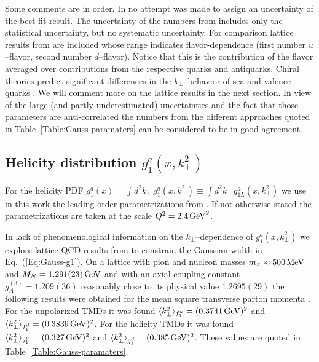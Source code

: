\documentclass[a4paper,11pt]{article}
\newcommand{\la}{\langle}
\newcommand{\ra}{\rangle}
\def\kperp{k_\perp}
\def\avkperp{\la \kperp^2 \ra}
\begin{document}
Some comments are in order.
In \cite{Anselmino:2005nn} no attempt was made to assign an uncertainty of the 
best fit result. The uncertainty of the numbers from \cite{Schweitzer:2010tt}
includes only the statistical uncertainty, but no systematic uncertainty.
For comparison lattice results from \cite{Hagler:2009mb} are included
whose range indicates flavor-dependence 
(first number $u$--flavor,
second number $d$--flavor). 
Notice that this is the contribution of the flavor averaged
over contributions from the respective quarks and antiquarks.
Chiral theories predict significant differences in the $\kperp$--behavior
of sea and valence quarks \cite{Schweitzer:2012hh}.
We will comment more on the lattice results in the next section.
In view of the large (and partly underestimated) uncertainties and the 
fact that those parameters are anti-correlated the numbers from the 
different approaches quoted in Table~\ref{Table:Gauss-paramaters} 
can be considered to be in good agreement. 

\subsection{\boldmath Helicity distribution $g_1^a(x,k_\perp^2)$}
\label{App:basis-g1}

For the helicity PDF $g_1^a(x)=\int d^2k_\perp\,g_1^a(x,k_\perp^2)\equiv 
\int d^2k_\perp\,g_{1L}^a(x,k_\perp^2)$ we use in this work the leading-order 
parametrizations from \cite{Gluck:1998xa}.
If not otherwise stated the parametrizations are taken at the scale 
$Q^2=2.4\,{\rm GeV}^2$.

In lack of phenomenological information on the $k_\perp$--dependence of
$g_1^a(x,k_\perp^2)$ we explore lattice QCD results from \cite{Hagler:2009mb}
to constrain the Gaussian width in Eq.~(\ref{Eq:Gauss-g1}). 
On a lattice with pion and nucleon masses 
$m_\pi\approx 500\,{\rm MeV}$ and $M_N=1.291(23)\,{\rm GeV}$ 
and with an axial coupling constant $g_A^{(3)}= 1.209(36)$ reasonably
close to its physical value $1.2695(29)$ the following results were
obtained for the mean square transverse parton momenta \cite{Hagler:2009mb}.
For the unpolarized TMDs it was found
$\langle \kperp^2 \rangle_{f_1^u} = (0.3741\,{\rm GeV})^2$ and
$\langle \kperp^2 \rangle_{f_1^d} = (0.3839\,{\rm GeV})^2$.
For the helicity TMDs it was found
$\avkperp_{g_1^u} = (0.327\,{\rm GeV})^2$ and
$\avkperp_{g_1^d} = (0.385\,{\rm GeV})^2$. 
These values are quoted in Table~\ref{Table:Gauss-paramaters}.
\end{document}
